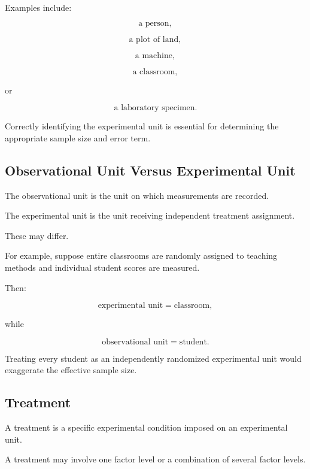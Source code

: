 Examples include:

\[
\boxed{
\text{a person},
}
\]

\[
\boxed{
\text{a plot of land},
}
\]

\[
\boxed{
\text{a machine},
}
\]

\[
\boxed{
\text{a classroom},
}
\]

or

\[
\boxed{
\text{a laboratory specimen}.
}
\]

Correctly identifying the experimental unit is essential for determining
the appropriate sample size and error term.

\subsection{Observational Unit Versus Experimental Unit}
\label{subsec:observational-versus-experimental-unit}

The observational unit is the unit on which measurements are recorded.

The experimental unit is the unit receiving independent treatment
assignment.

These may differ.

For example, suppose entire classrooms are randomly assigned to teaching
methods and individual student scores are measured.

Then:

\[
\boxed{
\text{experimental unit}
=
\text{classroom},
}
\]

while

\[
\boxed{
\text{observational unit}
=
\text{student}.
}
\]

Treating every student as an independently randomized experimental unit
would exaggerate the effective sample size.

\subsection{Treatment}
\label{subsec:treatment-design}

A treatment is a specific experimental condition imposed on an
experimental unit.

A treatment may involve one factor level or a combination of several
factor levels.

